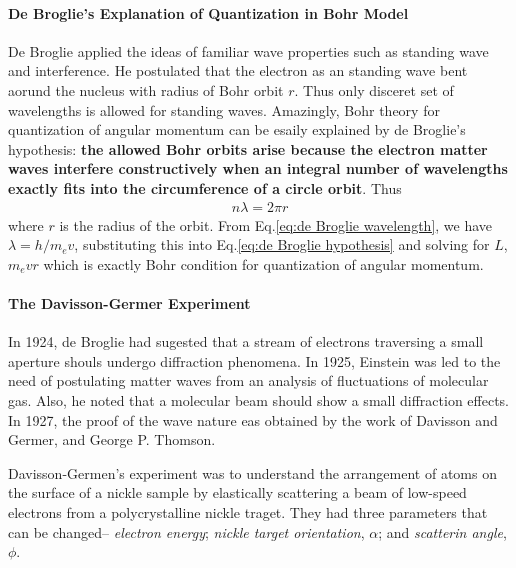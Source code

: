         \paragraph{De Broglie's Explanation of Quantization in Bohr Model} %
        \label{par:De Broglie's Explanation of Quantization in Bohr Model}
        De Broglie applied the ideas of familiar wave properties such as standing wave and interference. He postulated that the electron as an standing wave bent aorund
        the nucleus with radius of Bohr orbit $r$. Thus only disceret set of wavelengths is allowed for standing waves.
        Amazingly, Bohr theory for quantization of angular momentum can be esaily explained by de Broglie's hypothesis: \textbf{the allowed Bohr orbits arise because the 
        electron matter waves interfere constructively when an integral number of wavelengths exactly fits into the circumference of a circle orbit}. Thus
        \begin{align}
            \label{eq:de Broglie hypothesis}
            n \lambda = 2 \pi r
        \end{align}
        where $r$ is the radius of the orbit. From Eq.\eqref{eq:de Broglie wavelength}, we have $\lambda=h/m_e v$, substituting this into Eq.\eqref{eq:de Broglie hypothesis}
        and solving for $L$, $m_e v r$
        which is exactly Bohr condition for quantization of angular momentum.

        \paragraph{The Davisson-Germer Experiment} %
        \label{par:The Davisson-Germer Experiment}
        In 1924, de Broglie had sugested that a stream of electrons traversing a small aperture shouls undergo diffraction phenomena. In 1925, Einstein was led to the need
        of postulating matter waves from an analysis of fluctuations of molecular gas. Also, he noted that a molecular beam should show a small diffraction effects.
        In 1927, the proof of the wave nature eas obtained by the work of Davisson and Germer, and George P. Thomson.

        \bulletpar Davisson-Germen's experiment was to understand the arrangement of atoms on the surface of a nickle sample by elastically scattering a beam of low-speed
        electrons from a polycrystalline nickle traget. They had three parameters that can be changed-- \textit{electron energy}; \textit{nickle target orientation}, 
        $\alpha$; and \textit{scatterin angle}, $\phi$.


